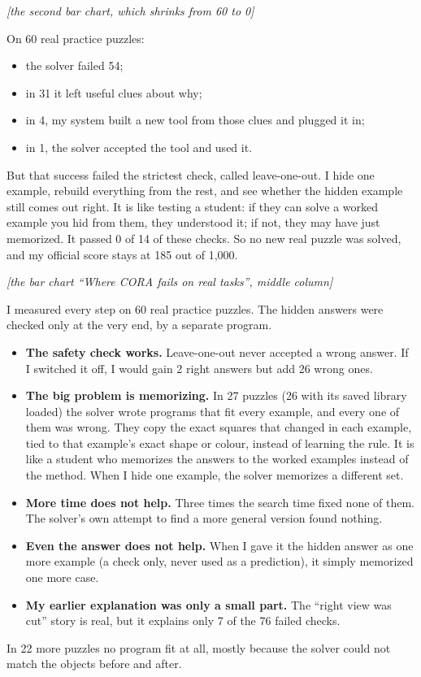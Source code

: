 \documentclass[11pt]{article}
\newcommand{\cue}[1]{{\color{ink2}\textit{[#1]}}\par}
\newcommand{\panel}[1]{\par\vspace{0.7em}{\large\bfseries\color{accent}#1}\par\vspace{0.05em}}
\begin{document}
\cue{the second bar chart, which shrinks from 60 to 0}
On 60 real practice puzzles:
\begin{itemize}
  \item the solver failed 54;
  \item in 31 it left useful clues about why;
  \item in 4, my system built a new tool from those clues and plugged it in;
  \item in 1, the solver accepted the tool and used it.
\end{itemize}
But that success failed the strictest check, called leave-one-out. I hide one example, rebuild everything
from the rest, and see whether the hidden example still comes out right. It is like testing a student: if
they can solve a worked example you hid from them, they understood it; if not, they may have just
memorized. It passed 0 of 14 of these checks. So no new real puzzle was solved, and my official score stays
at 185 out of 1,000.

\panel{5. Where it really fails}
\cue{the bar chart ``Where CORA fails on real tasks'', middle column}
I measured every step on 60 real practice puzzles. The hidden answers were checked only at the very end,
by a separate program.
\begin{itemize}
  \item \textbf{The safety check works.} Leave-one-out never accepted a wrong answer. If I switched it
    off, I would gain 2 right answers but add 26 wrong ones.
  \item \textbf{The big problem is memorizing.} In 27 puzzles (26 with its saved library loaded) the solver wrote programs that fit every
    example, and every one of them was wrong. They copy the exact squares that changed in each example,
    tied to that example's exact shape or colour, instead of learning the rule. It is like a student
    who memorizes the answers to the worked examples instead of the method. When I hide one example,
    the solver memorizes a different set.
  \item \textbf{More time does not help.} Three times the search time fixed none of them. The solver's own
    attempt to find a more general version found nothing.
  \item \textbf{Even the answer does not help.} When I gave it the hidden answer as one more example
    (a check only, never used as a prediction), it simply memorized one more case.
  \item \textbf{My earlier explanation was only a small part.} The ``right view was cut'' story is real,
    but it explains only 7 of the 76 failed checks.
\end{itemize}
In 22 more puzzles no program fit at all, mostly because the solver could not match the objects before
and after.
\end{document}

